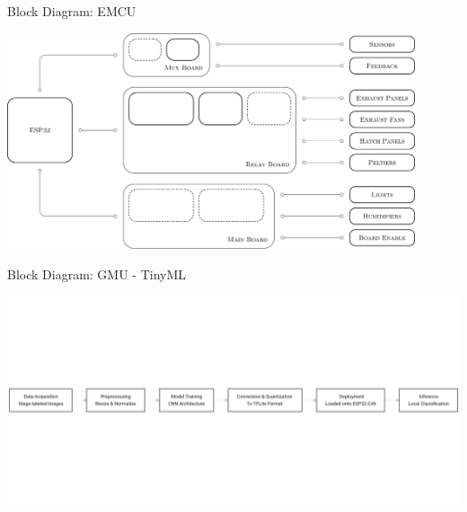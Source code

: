 \documentclass{beamer}
\begin{document}
\begin{frame} {Block Diagram: EMCU}

    \begin{center}

        \includegraphics[width = 0.9\textwidth]{emcu_block_diagram.pdf}

    \end{center}

\end{frame}

\begin{frame} {Block Diagram: GMU - TinyML}

    \begin{center}

        \includegraphics[width = \textwidth]{tinyml.png}

    \end{center}


\end{frame}
\end{document}
